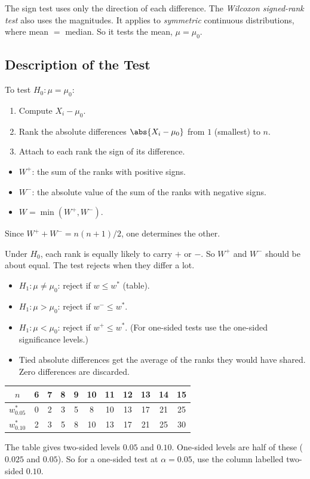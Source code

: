 The sign test uses only the direction of each difference. The \emph{Wilcoxon signed-rank test} also uses the magnitudes. It applies to \emph{symmetric} continuous distributions, where mean $=$ median. So it tests the mean, $\mu=\mu_0$.

\subsection{Description of the Test}

To test $H_0:\mu=\mu_0$:
\begin{enumerate}
  \item Compute $X_i-\mu_0$.
  \item Rank the absolute differences $\abs{X_i-\mu_0}$ from $1$ (smallest) to $n$.
  \item Attach to each rank the sign of its difference.
\end{enumerate}

\begin{definition}
\begin{itemize}
  \item $W^+$: the sum of the ranks with positive signs.
  \item $W^-$: the absolute value of the sum of the ranks with negative signs.
  \item $W=\min(W^+,W^-)$.
\end{itemize}
Since $W^++W^-=n(n+1)/2$, one determines the other.
\end{definition}

Under $H_0$, each rank is equally likely to carry $+$ or $-$. So $W^+$ and $W^-$ should be about equal. The test rejects when they differ a lot.
\begin{itemize}
  \item $H_1:\mu\ne\mu_0$: reject if $w\le w^*$ (table).
  \item $H_1:\mu>\mu_0$: reject if $w^-\le w^*$.
  \item $H_1:\mu<\mu_0$: reject if $w^+\le w^*$. (For one-sided tests use the one-sided significance levels.)
  \item Tied absolute differences get the average of the ranks they would have shared. Zero differences are discarded.
\end{itemize}

\begin{center}
\small
\begin{tabular}{c|cccccccccc}
\toprule
$n$ & 6 & 7 & 8 & 9 & 10 & 11 & 12 & 13 & 14 & 15\\
\midrule
$w^*_{0.05}$ & 0 & 2 & 3 & 5 & 8 & 10 & 13 & 17 & 21 & 25\\
$w^*_{0.10}$ & 2 & 3 & 5 & 8 & 10 & 13 & 17 & 21 & 25 & 30\\
\bottomrule
\end{tabular}
\end{center}
The table gives two-sided levels $0.05$ and $0.10$. One-sided levels are half of these ($0.025$ and $0.05$). So for a one-sided test at $\alpha=0.05$, use the column labelled two-sided $0.10$.

